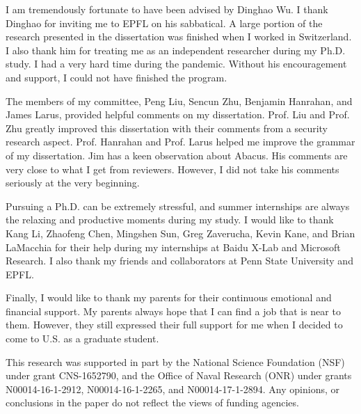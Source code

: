 I am tremendously fortunate to have been advised by Dinghao Wu.  I thank Dinghao for inviting me to EPFL on his sabbatical. A large portion of the research presented in the dissertation was finished when I worked in Switzerland. I also thank him for treating me as an independent researcher during my Ph.D. study. I had a very hard time during the pandemic. Without his encouragement and support, I could not have finished the program.

The members of my committee, Peng Liu, Sencun Zhu, Benjamin Hanrahan, and James Larus, provided helpful comments on my dissertation. Prof. Liu and Prof. Zhu greatly improved this dissertation with their comments from a security research aspect. Prof. Hanrahan and Prof. Larus helped me improve the grammar of my dissertation. Jim has a keen observation about Abacus. His comments are very close to what I get from reviewers. However, I did not take his comments seriously at the very beginning.  

Pursuing a Ph.D. can be extremely stressful, and summer internships are always the relaxing and productive moments during my study. I would like to thank Kang Li, Zhaofeng Chen, Mingshen Sun, Greg Zaverucha, Kevin Kane, and Brian LaMacchia for their help during my internships at Baidu X-Lab and Microsoft Research.  I also thank my friends and collaborators at Penn State University and EPFL. 

Finally, I would like to thank my parents for their continuous emotional and financial support. My parents always hope that I can find a job that is near to them. However, they still expressed their full support for me when I decided to come to U.S. as a graduate student.

This research was supported in part by the National Science Foundation (NSF) under grant CNS-1652790, and the Office of Naval Research (ONR) under grants N00014-16-1-2912, N00014-16-1-2265, and N00014-17-1-2894. Any opinions, or conclusions in the paper do not reflect the views of funding agencies.

